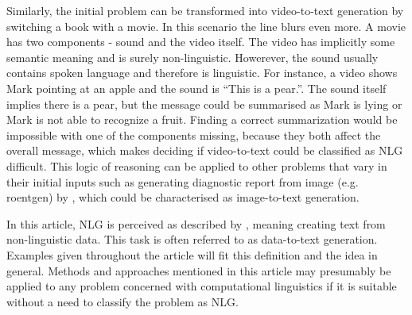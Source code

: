 Similarly, the initial problem can be transformed into video-to-text generation by switching a book with a movie. In this scenario the line blurs even more. A movie has two components - sound and the video itself. The video has implicitly some semantic meaning and is surely non-linguistic. Howerever, the sound usually contains spoken language and therefore is linguistic. For instance, a video shows Mark pointing at an apple and the sound is “This is a pear.”. The sound itself implies there is a pear, but the message could be summarised as Mark is lying or Mark is not able to recognize a fruit. Finding a correct summarization would be impossible with one of the components missing, because they both affect the overall message, which makes deciding if video-to-text could be classified as NLG difficult. This logic of reasoning can be applied to other problems that vary in their initial inputs such as generating diagnostic report from image (e.g. roentgen) by \cite{zeng2020generating}, which could be characterised as image-to-text generation.

In this article, NLG is perceived as described by \cite{reiter1997building}, meaning creating text from non-linguistic data. This task is often referred to as data-to-text generation. Examples given throughout the article will fit this definition and the idea in general. Methods and approaches mentioned in this article may presumably be applied to any problem concerned with computational linguistics if it is suitable without a need to classify the problem as NLG.

